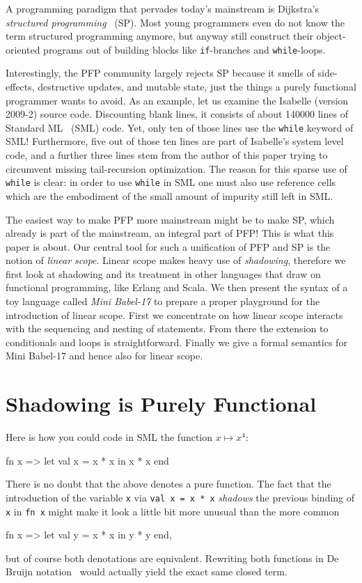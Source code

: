 \documentclass{llncs}
\newcommand{\bsrc}[1] {\lstinline!#1!}
\begin{document}
A programming paradigm that pervades today's mainstream is Dijkstra's \emph{structured programming}~\cite{structuredprogramming} (SP). Most young programmers even do not know the term structured programming anymore, but anyway still construct their object-oriented programs out of building blocks like \bsrc{if}-branches and \bsrc{while}-loops.

Interestingly, the PFP community largely rejects SP because it smells of side-effects, destructive updates, and mutable state, just the things a purely functional programmer wants to avoid. As an example, let us examine the Isabelle (version 2009-2) source code.
Discounting blank lines,  it consists of about 140000 lines of Standard ML~\cite{standardml} (SML) code. Yet, only ten of those lines use the \bsrc{while} keyword of SML! Furthermore, five out of those ten lines are part of Isabelle's system level code, and a further three lines stem from the author of this paper trying to circumvent missing tail-recursion optimization. The reason for this sparse use of \bsrc{while} is clear: in order to use \bsrc{while} in SML one must also use reference cells which are the embodiment of the small amount of impurity still left in SML. 

The easiest way to make PFP more mainstream might be to make SP, which already is part of the mainstream, an integral part of PFP! This is what this paper is about. Our central tool for such a unification of PFP and SP is the notion of \emph{linear scope}. Linear scope makes heavy use of \emph{shadowing}, therefore we first look at shadowing and its treatment in other languages that draw on functional programming, like Erlang and Scala. We then present the syntax of a toy language called  \emph{Mini Babel-17} to prepare a proper playground for the introduction of linear scope. First we concentrate on how linear scope interacts with the sequencing and nesting of statements. From there the extension to conditionals and loops is straightforward.
Finally we give a formal semantics for Mini Babel-17 and hence also for linear scope.

\section{Shadowing is Purely Functional}\label{sec:shadowing}
Here is how you could code in SML the function $x \mapsto x^4$:
\begin{babellisting}
fn x => let val x = x * x in x * x end
\end{babellisting}
There is no doubt that the above denotes a pure function. The fact that the introduction of the variable \bsrc{x} via \bsrc{val x = x * x} \emph{shadows} the previous binding of \bsrc{x} in \bsrc{fn x} might make it look a little bit more unusual than the more common 
\begin{babellisting}
fn x => let val y = x * x in y * y end,
\end{babellisting}
but of course both denotations are equivalent. Rewriting both functions in De Bruijn notation~\cite{debruijn} would actually yield the exact same closed term.
\end{document}
